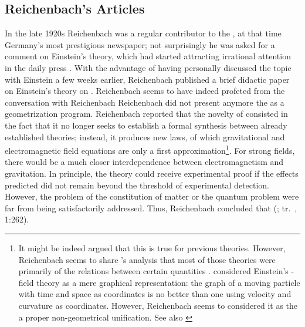 \documentclass[draft]{article}
\renewcommand{\me}{;~m.e.{}}
\newcommand{\FP}{\german{Fernparallelismus}\xspace}
\newcommand{\vza}[1]{(\cite{Reichenbach1929c}; tr.\ \citeyear{Reichenbach1978}, 1:#1)\xspace}
\begin{document}
\subsection{Reichenbach's Articles}


In the late 1920s Reichenbach was a regular contributor to the , at that time Germany's most prestigious newspaper; not surprisingly he was asked for a comment on Einstein's theory, which had started attracting irrational attention in the daily press \citep[see][346]{Pais1982}. With the advantage of having personally discussed the topic with Einstein a few weeks earlier, Reichenbach published a brief didactic paper on Einstein's theory on  \citep{Reichenbach1929c}. Reichenbach seems to have indeed profeted from the conversation with Reichenbach Reichenbach did not present anymore the \uftp as a geometrization program. Reichenbach reported that the novelty of \FP consisted in the fact that it no longer seeks to establish a formal synthesis between already established theories; instead, it produces new laws, of which gravitational and electromagnetic field equations are only a first approximation\footnote{It might be indeed argued that this is true for previous theories. However, Reichenbach seems to share \citet[84]{Eddington1923}'s analysis that most of those theories were primarily  of the relations between certain quantities \citep[\S15 and \S50]{Reichenbach1928a}. \citet[281]{Eddington1929} considered Einstein's \FP-field theory as a mere graphical representation: the graph of a moving particle with time and space as coordinates is no better than one using velocity and curvature as coordinates. However, Reichenbach seems to considered it as the a proper non-geometrical unification. See also \cite[121f.]{Goldstein2003}}. For strong fields, there would be a much closer interdependence between electromagnetism and gravitation. In principle, the theory could receive experimental proof if the effects predicted did not remain beyond the threshold of experimental detection. However, the problem of the constitution of matter or the quantum problem were far from being satisfactorily addressed. Thus, Reichenbach concluded that  \vza{262}. 
\end{document}
